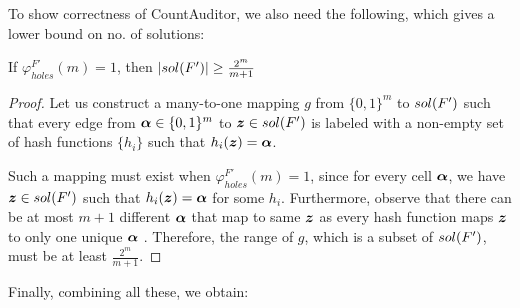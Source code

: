 To show correctness of CountAuditor, we also need the following, which gives a lower bound on no. of solutions:






	
	

	
	
	

	
	

	



\begin{lemma}[Necessary]
	\label{lem:holes}
	If 	$\varphi_{holes}^{F'}(m) =1$, then $|sol({F'})|\geq \frac{2^{m}}{m+1}$ 
\end{lemma}
\begin{proof}
	Let us construct a many-to-one mapping $g$ from $\{0,1\}^m$ to $sol({F'})$ such that every edge  from ${\boldsymbol{\alpha}} \in \{0,1\}^m$ to ${\boldsymbol{z}} \in sol({F'})$ is labeled with a non-empty set of hash functions $\{h_i\}$ such that $h_i({\boldsymbol{z}}) = {\boldsymbol{\alpha}}$.  
	
	Such a mapping must exist when $\varphi_{holes}^{F'}(m) =1$, since for every cell ${\boldsymbol{\alpha}}$, we have  ${\boldsymbol{z}} \in sol({F'})$ such that $h_i({\boldsymbol{z}})  = {\boldsymbol{\alpha}}$ for some $h_i$.  Furthermore, observe that there can be at most $m + 1$ different ${\boldsymbol{\alpha}}$ that map to same ${\boldsymbol{z}}$ as every hash function maps ${\boldsymbol{z}}$ to only one unique ${\boldsymbol{\alpha}}$ . Therefore, the range of $g$, which is a subset of $sol({F'})$, must be at least $\frac{2^m}{m  + 1}$.
	
\end{proof}












Finally, combining all these, we obtain:

